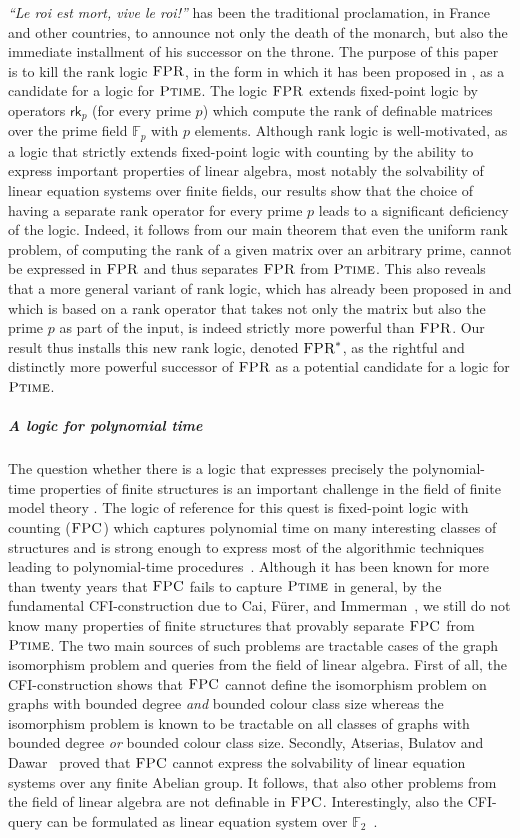 \documentclass[a4paper,UKenglish]{lipics}
\newcommand{\field}[1]{\mathbb{#1}}
\newcommand{\logic}[1]{\ensuremath{\textsc{#1}}\xspace}
\newcommand{\FPC}{\logic{FPC}}
\newcommand{\FPRK}{\logic{FPR}}
\newcommand{\FPR}{\FPRK}
\newcommand{\FPRvar}{\ensuremath{\logic{FPR}^*}\xspace}
\newcommand{\rkp}{\ensuremath{\textsf{rk}_p}\xspace}
\newcommand{\compclass}[1]{\ensuremath{\textsc{#1}}\xspace}
\newcommand{\PTIME}{\compclass{Ptime}}
\theoremstyle{plain}
\begin{document}
\emph{``Le roi est mort, vive le roi!''} has been the traditional proclamation,
in France and other countries,
to announce not only the death of the monarch, but also the
immediate installment of his successor on the throne.
The purpose of this paper is to kill the rank logic \FPR, in the form in which 
it
has been proposed in \cite{DaGrHoLa09},  as a candidate for a logic for \PTIME.
The logic \FPR extends fixed-point logic by operators $\rkp$ (for every
prime $p$) which compute the rank of definable matrices over the prime
field $\field F_p$ with $p$ elements. Although rank logic is well-motivated,
as a logic that strictly extends fixed-point logic with counting
by the ability to express important properties of linear algebra,
most notably the solvability of linear equation systems over finite
fields, our results show that the choice of having a separate rank operator 
for every prime $p$ leads to a significant deficiency of the logic.
Indeed, it follows from our main theorem that 
even the uniform rank problem, of computing the rank of a 
given matrix over an arbitrary prime, cannot be expressed in \FPR
and thus separates $\FPR$ from \PTIME. 
This also reveals that a more general variant of rank logic,
which has already been proposed in \cite{Ho10, La11, Pa10}
and which is based on a rank operator that takes not only the matrix but also
the prime $p$ as part of the input, is indeed strictly
more powerful than $\FPR$. 
Our result thus installs this
new rank logic, denoted \FPRvar, as the rightful 
and distinctly more powerful successor of 
\FPR as a potential candidate for a logic for \PTIME. 

\subparagraph*{A logic for polynomial time}
The question whether there is a logic that expresses precisely the 
polynomial-time properties of finite structures
is an important challenge in the field of finite model theory 
\cite{FMTbook,Gr08}. 
The logic of reference for this quest is
fixed-point logic with counting (\FPC) which
captures polynomial time on many interesting classes
of structures and is strong enough to express most of 
the algorithmic techniques leading to polynomial-time procedures~\cite{Da15}.
Although it has been known for more than twenty years that
\FPC fails to capture \PTIME in general, by the fundamental
CFI-construction due to Cai, Fürer, and Immerman~\cite{CFI92},
we still do not know many properties of finite structures
that provably separate \FPC from \PTIME.
The two main sources of such problems
are tractable cases of the graph isomorphism problem and queries from the field
of linear algebra.
First of all, the CFI-construction shows that \FPC 
cannot define the isomorphism problem on graphs with bounded 
degree \emph{and}  bounded colour class size
whereas the isomorphism problem is known to
be tractable on all classes of graphs  
with bounded degree \emph{or} bounded colour class size. 
Secondly, Atserias, Bulatov and Dawar~\cite{AtBuDa09} proved 
that \FPC cannot express the solvability of linear equation systems over 
any finite Abelian group. 
It follows, that also other problems from the field of linear 
algebra are not definable in \FPC.
Interestingly, also the CFI-query can be formulated
as linear equation system over $\field F_2$~\cite{DaGrHoLa09}.
\end{document}
